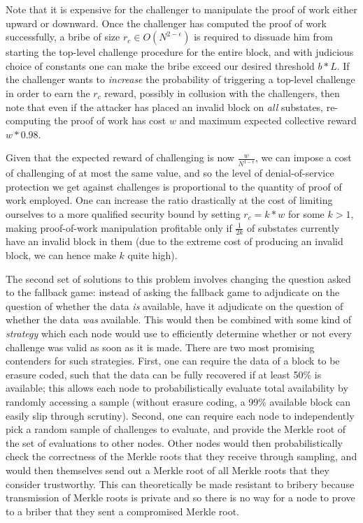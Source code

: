 \documentclass[11pt,a4paper]{report}
\theoremstyle{plain}
\theoremstyle{definition}
\theoremstyle{remark}
\begin{document}
Note that it is expensive for the challenger to manipulate the proof of work either upward or downward. Once the challenger has computed the proof of work successfully, a bribe of size $r_c \in O(N^{2-\epsilon})$ is required to dissuade him from starting the top-level challenge procedure for the entire block, and with judicious choice of constants one can make the bribe exceed our desired threshold $b * L$. If the challenger wants to \emph{increase} the probability of triggering a top-level challenge in order to earn the $r_c$ reward, possibly in collusion with the challengers, then note that even if the attacker has placed an invalid block on \emph{all} substates, re-computing the proof of work has cost $w$ and maximum expected collective reward $w * 0.98$.

Given that the expected reward of challenging is now $\frac{w}{N^{1-\epsilon}}$, we can impose a cost of challenging of at most the same value, and so the level of denial-of-service protection we get against challenges is proportional to the quantity of proof of work employed. One can increase the ratio drastically at the cost of limiting ourselves to a more qualified security bound by setting $r_c = k * w$ for some $k > 1$, making proof-of-work manipulation profitable only if $\frac{1}{2k}$ of substates currently have an invalid block in them (due to the extreme cost of producing an invalid block, we can hence make $k$ quite high).

The second set of solutions to this problem involves changing the question asked to the fallback game: instead of asking the fallback game to adjudicate on the question of whether the data \emph{is} available, have it adjudicate on the question of whether the data \emph{was} available. This would then be combined with some kind of \emph{strategy} which each node would use to efficiently determine whether or not every challenge was valid as soon as it is made. There are two most promising contenders for such strategies. First, one can require the data of a block to be erasure coded, such that the data can be fully recovered if at least 50\% is available; this allows each node to probabilistically evaluate total availability by randomly accessing a sample (without erasure coding, a 99\% available block can easily slip through scrutiny). Second, one can require each node to independently pick a random sample of challenges to evaluate, and provide the Merkle root of the set of evaluations to other nodes. Other nodes would then probabilistically check the correctness of the Merkle roots that they receive through sampling, and would then themselves send out a Merkle root of all Merkle roots that they consider trustworthy. This can theoretically be made resistant to bribery because transmission of Merkle roots is private and so there is no way for a node to prove to a briber that they sent a compromised Merkle root.
\end{document}
